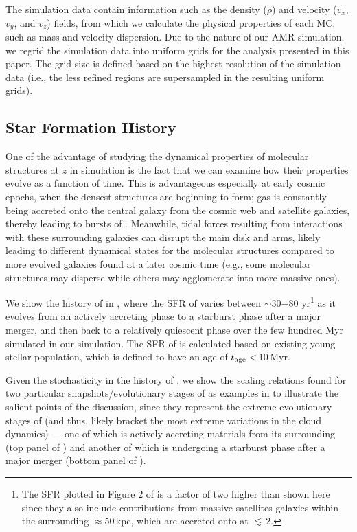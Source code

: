 \documentclass[iop]{emulateapj} %
\begin{document}
The simulation data contain information such as the density ($\rho$) and velocity ($v_x$, $v_y$, and $v_z$) fields, from which we calculate 
the physical properties of each MC, such as mass and velocity dispersion.
Due to the nature of our AMR simulation, we regrid the simulation data into uniform grids for the analysis presented in this paper. 
The grid size is defined 
based on the highest resolution of the simulation data (i.e., the less refined regions are supersampled in the resulting uniform grids). 



\subsection{Star Formation History} \label{sec:sfh}
One of the advantage of studying the dynamical properties of molecular structures at
$z$ in simulation is the fact that we can examine how their properties evolve
as a function of time.
This is advantageous especially at early cosmic epochs,
when the densest structures are beginning to form;
gas is constantly being accreted onto the central galaxy from the cosmic web and
satellite galaxies, thereby leading to bursts of \SF.
Meanwhile, tidal forces resulting from interactions with these surrounding
galaxies can disrupt the main disk and arms, likely leading to different dynamical states
for the molecular structures compared to more evolved galaxies found at 
a later cosmic time (e.g., some molecular structures may disperse while others may agglomerate into more massive
ones). %

We show the \SF history of \flower in , where
the SFR of \flower varies between $\sim$30$-$80\,\Msun\,yr\pmOne\footnote{
The SFR plotted in Figure 2 of \citet{Pallottini17b}
is a factor of two higher than shown here since they also include contributions from
massive satellites galaxies within the surrounding $\approx$50\,kpc, which
are accreted onto \flower at \z$\lesssim$\,2.}
as it evolves from an actively accreting phase to
a starburst phase after a major merger, and then back to a relatively quiescent phase
over the few hundred Myr simulated in our simulation.
The SFR of \flower is calculated based on existing young stellar population, which is
defined to have an age of $t_{\rm age}<$\,10\,Myr.

Given the stochasticity in the \SF history of \flower,
we show the scaling relations found for two particular snapshots/evolutionary stages of \flower
as examples in  to illustrate the salient points of the discussion,
since they represent the extreme evolutionary stages of \flower (and thus, likely bracket the
most extreme variations in the cloud dynamics) --- one of which \flower is
actively accreting materials from its surrounding (top panel of )
and another of which \flower is undergoing
a starburst phase after a major merger (bottom panel of ).
\end{document}

